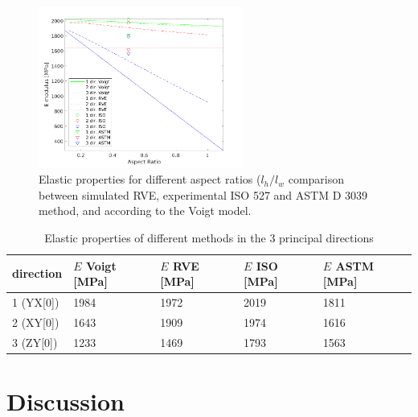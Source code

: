 \begin{figure}[H]
    \centering
    \includegraphics[width=0.60\textwidth]{chapter_6_Elasticmodelling/figures/Elasticproperties.png}
    \caption{Elastic properties for different aspect ratios ($l_h/l_w$ comparison between simulated RVE, experimental ISO 527 and ASTM D 3039 method, and according to the Voigt model.}
    \label{fig:Elasticproperties}
\end{figure}
\begin{table}
\caption{Elastic properties of different methods in the 3 principal directions}
\begin{tabular}{p{2.2cm}p{2.2cm}p{2.2cm}p{2.2cm}p{2.2cm}}
 \hline
direction & $E$ Voigt [MPa] & $E$ RVE [MPa]& $E$ ISO [MPa]& $E$ ASTM [MPa] \\ 
\hline
1 (YX[0]) & 1984 & 1972 & 2019 & 1811 \\
2 (XY[0]) & 1643 & 1909 & 1974 & 1616 \\
3 (ZY[0]) & 1233 & 1469 & 1793 & 1563 \\
 \hline
\end{tabular}
     \label{tab:Elasticproperties}
\end{table}

\section{Discussion}
